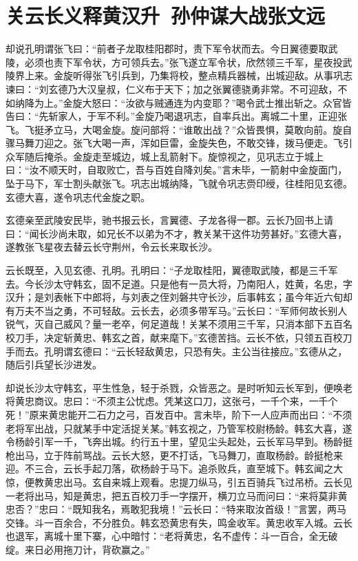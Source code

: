 \chapter{关云长义释黄汉升~孙仲谋大战张文远}

却说孔明谓张飞曰：“前者子龙取桂阳郡时，责下军令状而去。今日翼德要取武陵，必须也责下军令状，方可领兵去。”张飞遂立军令状，欣然领三千军，星夜投武陵界上来。金旋听得张飞引兵到，乃集将校，整点精兵器械，出城迎敌。从事巩志谏曰：“刘玄德乃大汉皇叔，仁义布于天下；加之张翼德骁勇非常。不可迎敌，不如纳降为上。”金旋大怒曰：“汝欲与贼通连为内变耶？”喝令武士推出斩之。众官皆告曰：“先斩家人，于军不利。”金旋乃喝退巩志，自率兵出。离城二十里，正迎张飞。飞挺矛立马，大喝金旋。旋问部将：“谁敢出战？”众皆畏惧，莫敢向前。旋自骤马舞刀迎之。张飞大喝一声，浑如巨雷，金旋失色，不敢交锋，拨马便走。飞引众军随后掩杀。金旋走至城边，城上乱箭射下。旋惊视之，见巩志立于城上曰：“汝不顺天时，自取败亡，吾与百姓自降刘矣。”言未毕，一箭射中金旋面门，坠于马下，军士割头献张飞。巩志出城纳降，飞就令巩志赍印绶，往桂阳见玄德。玄德大喜，遂令巩志代金旋之职。

玄德亲至武陵安民毕，驰书报云长，言翼德、子龙各得一郡。云长乃回书上请曰：“闻长沙尚未取，如兄长不以弟为不才，教关某干这件功劳甚好。”玄德大喜，遂教张飞星夜去替云长守荆州，令云长来取长沙。

云长既至，入见玄德、孔明。孔明曰：“子龙取桂阳，翼德取武陵，都是三千军去。今长沙太守韩玄，固不足道。只是他有一员大将，乃南阳人，姓黄，名忠，字汉升；是刘表帐下中郎将，与刘表之侄刘磐共守长沙，后事韩玄；虽今年近六旬却有万夫不当之勇，不可轻敌。云长去，必须多带军马。”云长曰：“军师何故长别人锐气，灭自己威风？量一老卒，何足道哉！关某不须用三千军，只消本部下五百名校刀手，决定斩黄忠、韩玄之首，献来麾下。”玄德苦挡。云长不依，只领五百校刀手而去。孔明谓玄德曰：“云长轻敌黄忠，只恐有失。主公当往接应。”玄德从之，随后引兵望长沙进发。

却说长沙太守韩玄，平生性急，轻于杀戮，众皆恶之。是时听知云长军到，便唤老将黄忠商议。忠曰：“不须主公忧虑。凭某这口刀，这张弓，一千个来，一千个死！”原来黄忠能开二石力之弓，百发百中。言未毕，阶下一人应声而出曰：“不须老将军出战，只就某手中定活捉关某。”韩玄视之，乃管军校尉杨龄。韩玄大喜，遂令杨龄引军一千，飞奔出城。约行五十里，望见尘头起处，云长军马早到。杨龄挺枪出马，立于阵前骂战。云长大怒，更不打话，飞马舞刀，直取杨龄。龄挺枪来迎。不三合，云长手起刀落，砍杨龄于马下。追杀败兵，直至城下。韩玄闻之大惊，便教黄忠出马。玄自来城上观看。忠提刀纵马，引五百骑兵飞过吊桥。云长见一老将出马，知是黄忠，把五百校刀手一字摆开，横刀立马而问曰：“来将莫非黄忠否？”忠曰：“既知我名，焉敢犯我境！”云长曰：“特来取汝首级！”言罢，两马交锋。斗一百余合，不分胜负。韩玄恐黄忠有失，鸣金收军。黄忠收军入城。云长也退军，离城十里下寨，心中暗忖：“老将黄忠，名不虚传：斗一百合，全无破绽。来日必用拖刀计，背砍赢之。”

